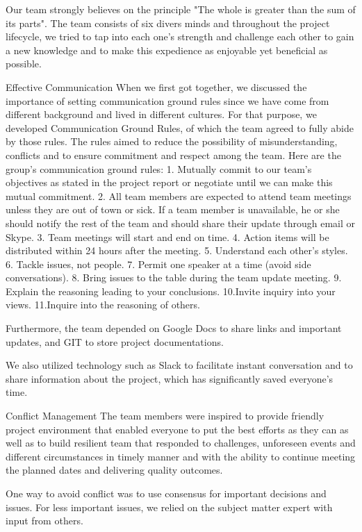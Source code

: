 \documentclass{article}
\begin{document}
Our team strongly believes on the principle "The whole is greater than the sum of its parts". The team consists of six divers minds and throughout the project lifecycle, we tried to tap into each one’s strength and challenge each other to gain a new knowledge and to make this expedience as enjoyable yet beneficial as possible.

Effective Communication
When we first got together, we discussed the importance of setting communication ground rules since we have come from different background and lived in different cultures. For that purpose, we developed Communication Ground Rules, of which the team agreed to fully abide by those rules. The rules aimed to reduce the possibility of misunderstanding, conflicts and to ensure commitment and respect among the team.
Here are the group’s communication ground rules:
1.    Mutually commit to our team’s objectives as stated in the project report or negotiate until we can make this mutual commitment.
2.    All team members are expected to attend team meetings unless they are out of town or sick. If a team member is unavailable, he or she should notify the rest of the team and should share their update through email or Skype.
3.    Team meetings will start and end on time.
4.    Action items will be distributed within 24 hours after the meeting.
5.    Understand each other’s styles.
6.    Tackle issues, not people.
7.    Permit one speaker at a time (avoid side conversations).
8.    Bring issues to the table during the team update meeting.
9.    Explain the reasoning leading to your conclusions.
10.Invite inquiry into your views.
11.Inquire into the reasoning of others.

Furthermore, the team depended on Google Docs to share links and important updates, and GIT to store project documentations.

We also utilized technology such as Slack to facilitate instant conversation and to share information about the project, which has significantly saved everyone’s time.

Conflict Management
The team members were inspired to provide friendly project environment that enabled everyone to put the best efforts as they can as well as to build resilient team that responded to challenges, unforeseen events and different circumstances in timely manner and with the ability to continue meeting the planned dates and delivering quality outcomes.

One way to avoid conflict was to use consensus for important decisions and issues. For less important issues, we relied on the subject matter expert with input from others.
\end{document}
